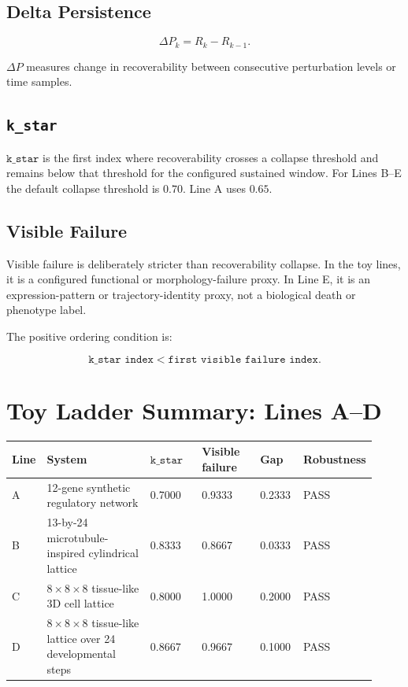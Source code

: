 \documentclass[11pt]{article}
\begin{document}
\subsection{Delta Persistence}

\[
\Delta P_k = R_k - R_{k-1}.
\]

\(\Delta P\) measures change in recoverability between consecutive perturbation levels or time samples.

\subsection{\texttt{k\_star}}

\(\texttt{k\_star}\) is the first index where recoverability crosses a collapse threshold and remains below that threshold for the configured sustained window. For Lines B--E the default collapse threshold is \(0.70\). Line A uses \(0.65\).

\subsection{Visible Failure}

Visible failure is deliberately stricter than recoverability collapse. In the toy lines, it is a configured functional or morphology-failure proxy. In Line E, it is an expression-pattern or trajectory-identity proxy, not a biological death or phenotype label.

The positive ordering condition is:

\[
\texttt{k\_star index} < \texttt{first visible failure index}.
\]

\section{Toy Ladder Summary: Lines A--D}

\begin{longtable}{p{0.07\linewidth}p{0.31\linewidth}p{0.15\linewidth}p{0.17\linewidth}p{0.12\linewidth}p{0.10\linewidth}}
\toprule
Line & System & \(\texttt{k\_star}\) & Visible failure & Gap & Robustness \\
\midrule
A & 12-gene synthetic regulatory network & 0.7000 & 0.9333 & 0.2333 & PASS \\
B & 13-by-24 microtubule-inspired cylindrical lattice & 0.8333 & 0.8667 & 0.0333 & PASS \\
C & \(8\times8\times8\) tissue-like 3D cell lattice & 0.8000 & 1.0000 & 0.2000 & PASS \\
D & \(8\times8\times8\) tissue-like lattice over 24 developmental steps & 0.8667 & 0.9667 & 0.1000 & PASS \\
\bottomrule
\end{longtable}
\end{document}
